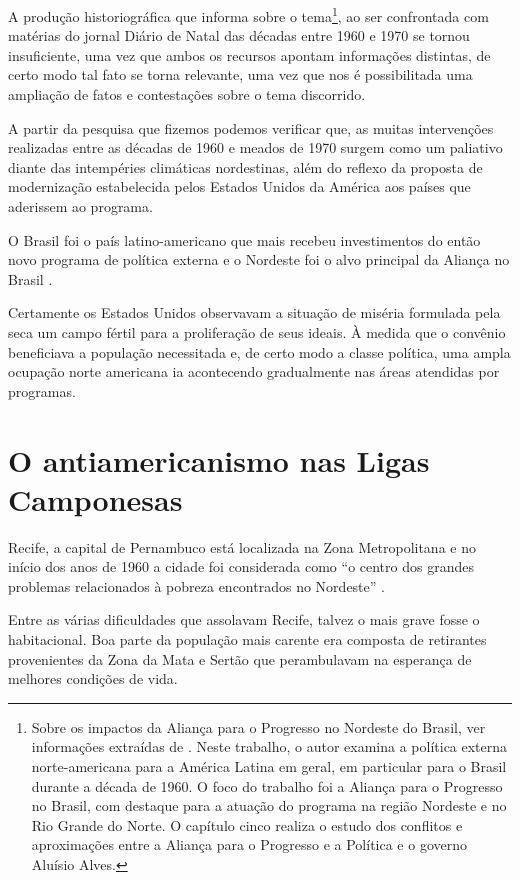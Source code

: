 \begin{refsection}
    A produção historiográfica que informa sobre o tema\footnote{Sobre os impactos da Aliança para o Progresso no Nordeste do Brasil, ver informações extraídas de . Neste trabalho, o autor examina a política externa norte-americana para a América Latina em geral, em particular para o Brasil durante a década de 1960. O foco do trabalho foi a Aliança para o Progresso no Brasil, com destaque para a atuação do programa na região Nordeste e no Rio Grande do Norte. O capítulo cinco realiza o estudo dos conflitos e aproximações entre a Aliança para o Progresso e a Política e o governo Aluísio Alves.}, ao ser confrontada com matérias do jornal Diário de Natal das décadas entre 1960 e 1970 se tornou insuficiente, uma vez que ambos os recursos apontam informações distintas, de certo modo tal fato se torna relevante, uma vez que nos é possibilitada uma ampliação de fatos e contestações sobre o tema discorrido. 

    A partir da pesquisa que fizemos podemos verificar que, as muitas intervenções realizadas entre as décadas de 1960 e meados de 1970 surgem como um paliativo diante das intempéries climáticas nordestinas, além do reflexo da proposta de modernização estabelecida pelos Estados Unidos da América aos países que aderissem ao programa. 

    O Brasil foi o país latino-americano que mais recebeu investimentos do então novo programa de política externa e o Nordeste foi o alvo principal da Aliança no Brasil \cite[p.~6]{Pereira2005Criar}.

    Certamente os Estados Unidos observavam a situação de miséria formulada pela seca um campo fértil para a proliferação de seus ideais. À medida que o convênio beneficiava a população necessitada e, de certo modo a classe política, uma ampla ocupação norte americana ia acontecendo gradualmente nas áreas atendidas por programas.


    \section{O antiamericanismo nas Ligas Camponesas}

    Recife, a capital de Pernambuco está localizada na Zona Metropolitana e no início dos anos de 1960 a cidade foi considerada como ``o centro dos grandes problemas relacionados à pobreza encontrados no Nordeste'' \cite[p.~30]{Page1972Revolucao}. 

    Entre as várias dificuldades que assolavam Recife, talvez o mais grave fosse o habitacional. Boa parte da população mais carente era composta de retirantes provenientes da Zona da Mata e Sertão que perambulavam na esperança de melhores condições de vida.  


\end{refsection}
